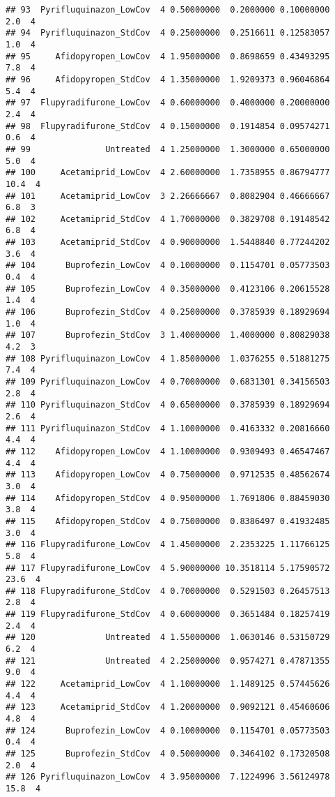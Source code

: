 \documentclass[
]{article}
\begin{document}
\begin{verbatim}
## 93  Pyrifluquinazon_LowCov  4 0.50000000  0.2000000 0.10000000      2.0  4
## 94  Pyrifluquinazon_StdCov  4 0.25000000  0.2516611 0.12583057      1.0  4
## 95     Afidopyropen_LowCov  4 1.95000000  0.8698659 0.43493295      7.8  4
## 96     Afidopyropen_StdCov  4 1.35000000  1.9209373 0.96046864      5.4  4
## 97  Flupyradifurone_LowCov  4 0.60000000  0.4000000 0.20000000      2.4  4
## 98  Flupyradifurone_StdCov  4 0.15000000  0.1914854 0.09574271      0.6  4
## 99               Untreated  4 1.25000000  1.3000000 0.65000000      5.0  4
## 100     Acetamiprid_LowCov  4 2.60000000  1.7358955 0.86794777     10.4  4
## 101     Acetamiprid_LowCov  3 2.26666667  0.8082904 0.46666667      6.8  3
## 102     Acetamiprid_StdCov  4 1.70000000  0.3829708 0.19148542      6.8  4
## 103     Acetamiprid_StdCov  4 0.90000000  1.5448840 0.77244202      3.6  4
## 104      Buprofezin_LowCov  4 0.10000000  0.1154701 0.05773503      0.4  4
## 105      Buprofezin_LowCov  4 0.35000000  0.4123106 0.20615528      1.4  4
## 106      Buprofezin_StdCov  4 0.25000000  0.3785939 0.18929694      1.0  4
## 107      Buprofezin_StdCov  3 1.40000000  1.4000000 0.80829038      4.2  3
## 108 Pyrifluquinazon_LowCov  4 1.85000000  1.0376255 0.51881275      7.4  4
## 109 Pyrifluquinazon_LowCov  4 0.70000000  0.6831301 0.34156503      2.8  4
## 110 Pyrifluquinazon_StdCov  4 0.65000000  0.3785939 0.18929694      2.6  4
## 111 Pyrifluquinazon_StdCov  4 1.10000000  0.4163332 0.20816660      4.4  4
## 112    Afidopyropen_LowCov  4 1.10000000  0.9309493 0.46547467      4.4  4
## 113    Afidopyropen_LowCov  4 0.75000000  0.9712535 0.48562674      3.0  4
## 114    Afidopyropen_StdCov  4 0.95000000  1.7691806 0.88459030      3.8  4
## 115    Afidopyropen_StdCov  4 0.75000000  0.8386497 0.41932485      3.0  4
## 116 Flupyradifurone_LowCov  4 1.45000000  2.2353225 1.11766125      5.8  4
## 117 Flupyradifurone_LowCov  4 5.90000000 10.3518114 5.17590572     23.6  4
## 118 Flupyradifurone_StdCov  4 0.70000000  0.5291503 0.26457513      2.8  4
## 119 Flupyradifurone_StdCov  4 0.60000000  0.3651484 0.18257419      2.4  4
## 120              Untreated  4 1.55000000  1.0630146 0.53150729      6.2  4
## 121              Untreated  4 2.25000000  0.9574271 0.47871355      9.0  4
## 122     Acetamiprid_LowCov  4 1.10000000  1.1489125 0.57445626      4.4  4
## 123     Acetamiprid_StdCov  4 1.20000000  0.9092121 0.45460606      4.8  4
## 124      Buprofezin_LowCov  4 0.10000000  0.1154701 0.05773503      0.4  4
## 125      Buprofezin_StdCov  4 0.50000000  0.3464102 0.17320508      2.0  4
## 126 Pyrifluquinazon_LowCov  4 3.95000000  7.1224996 3.56124978     15.8  4

\end{verbatim}
\end{document}
